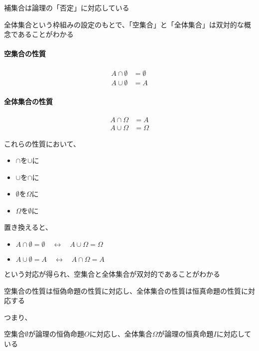 \documentclass[../book_ronri-and-set]{subfiles}
\begin{document}
補集合は論理の「否定」に対応している

\sectionline

全体集合という枠組みの設定のもとで、「空集合」と「全体集合」は双対的な概念であることがわかる

\begin{oframed}
  \paragraph{空集合の性質}
  \begin{align*}
    A \cap \emptyset & = \emptyset \\
    A \cup \emptyset & = A
  \end{align*}
\end{oframed}

\begin{oframed}
  \paragraph{全体集合の性質}
  \begin{align*}
    A \cap \Omega & = A      \\
    A \cup \Omega & = \Omega
  \end{align*}
\end{oframed}

これらの性質において、
\begin{itemize}
  \item $\cap$を$\cup$に
  \item $\cup$を$\cap$に
  \item $\emptyset$を$\Omega$に
  \item $\Omega$を$\emptyset$に
\end{itemize}
置き換えると、
\begin{itemize}
  \item $A \cap \emptyset = \emptyset \quad \leftrightarrow \quad A \cup \Omega = \Omega$
  \item $A \cup \emptyset = A \quad \leftrightarrow \quad A \cap \Omega = A$
\end{itemize}
という対応が得られ、空集合と全体集合が双対的であることがわかる

\sectionline

空集合の性質は恒偽命題の性質に対応し、全体集合の性質は恒真命題の性質に対応する

\br

つまり、
\begin{shaded*}
  空集合$\emptyset$が論理の恒偽命題$O$に対応し、全体集合$\Omega$が論理の恒真命題$I$に対応している
\end{shaded*}
\end{document}
